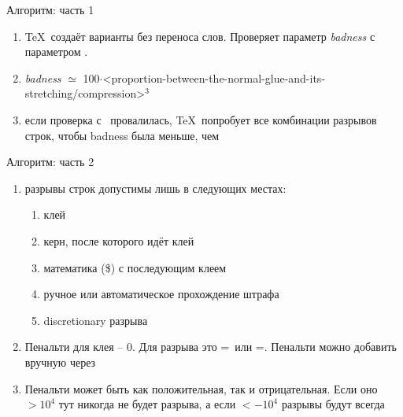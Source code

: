 {\begin{frame}{Алгоритм: часть 1}\relax

    \begin{enumerate}
        \item \TeX\ создаёт варианты без переноса слов. Проверяет параметр \textit{badness} с параметром \ccol\pretolerance. 
        \item \textit{badness} $\simeq$ 100$\cdot$<proportion-between-the-normal-glue-and-its-stretching/compression>$^3$
        \item если проверка с \ccol\pretolerance\ провалилась, \TeX\ попробует все комбинации разрывов строк, чтобы badness была меньше, чем \ccol\tolerance
         
    \end{enumerate}
     
\end{frame}

\begin{frame}{Алгоритм: часть 2}\relax
    \footnotesize
    \begin{enumerate}
        \item разрывы строк допустимы лишь в следующих местах:
        \begin{enumerate}
            \item клей
            \item керн, после которого идёт клей 
            \item математика (\$) с последующим клеем
            \item ручное или автоматическое прохождение штрафа
            \item  discretionary разрыва
        \end{enumerate}
        \item Пенальти для клея -- $0$. Для разрыва это \ccol\hyphenpenalty=\ или \ccol\exhyphenpenalty=. Пенальти можно добавить вручную через \ccol\penalty
        \item Пенальти может быть как положительная, так и отрицательная. Если оно $>10^4$ тут никогда не будет разрыва, а если $<-10^4$ разрывы будут всегда
         
    \end{enumerate}
         
\end{frame}


}
